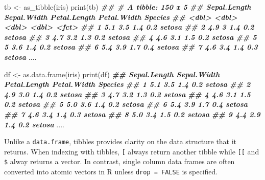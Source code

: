 \documentclass[
]{book}
\newenvironment{Shaded}{\begin{snugshade}}{\end{snugshade}}
\newcommand{\DocumentationTok}[1]{\textcolor[rgb]{0.56,0.35,0.01}{\textbf{\textit{#1}}}}
\newcommand{\FunctionTok}[1]{\textcolor[rgb]{0.00,0.00,0.00}{#1}}
\newcommand{\NormalTok}[1]{#1}
\newcommand{\OtherTok}[1]{\textcolor[rgb]{0.56,0.35,0.01}{#1}}
\begin{document}
\begin{Shaded}
\begin{Highlighting}[]
\NormalTok{tb }\OtherTok{\textless{}{-}} \FunctionTok{as\_tibble}\NormalTok{(iris)}
\FunctionTok{print}\NormalTok{(tb)}
\DocumentationTok{\#\# \# A tibble: 150 x 5}
\DocumentationTok{\#\#    Sepal.Length Sepal.Width Petal.Length Petal.Width Species}
\DocumentationTok{\#\#           \textless{}dbl\textgreater{}       \textless{}dbl\textgreater{}        \textless{}dbl\textgreater{}       \textless{}dbl\textgreater{} \textless{}fct\textgreater{}  }
\DocumentationTok{\#\#  1          5.1         3.5          1.4         0.2 setosa }
\DocumentationTok{\#\#  2          4.9         3            1.4         0.2 setosa }
\DocumentationTok{\#\#  3          4.7         3.2          1.3         0.2 setosa }
\DocumentationTok{\#\#  4          4.6         3.1          1.5         0.2 setosa }
\DocumentationTok{\#\#  5          5           3.6          1.4         0.2 setosa }
\DocumentationTok{\#\#  6          5.4         3.9          1.7         0.4 setosa }
\DocumentationTok{\#\#  7          4.6         3.4          1.4         0.3 setosa }
\NormalTok{....}

\NormalTok{df }\OtherTok{\textless{}{-}} \FunctionTok{as.data.frame}\NormalTok{(iris)}
\FunctionTok{print}\NormalTok{(df)}
\DocumentationTok{\#\#     Sepal.Length Sepal.Width Petal.Length Petal.Width    Species}
\DocumentationTok{\#\# 1            5.1         3.5          1.4         0.2     setosa}
\DocumentationTok{\#\# 2            4.9         3.0          1.4         0.2     setosa}
\DocumentationTok{\#\# 3            4.7         3.2          1.3         0.2     setosa}
\DocumentationTok{\#\# 4            4.6         3.1          1.5         0.2     setosa}
\DocumentationTok{\#\# 5            5.0         3.6          1.4         0.2     setosa}
\DocumentationTok{\#\# 6            5.4         3.9          1.7         0.4     setosa}
\DocumentationTok{\#\# 7            4.6         3.4          1.4         0.3     setosa}
\DocumentationTok{\#\# 8            5.0         3.4          1.5         0.2     setosa}
\DocumentationTok{\#\# 9            4.4         2.9          1.4         0.2     setosa}
\NormalTok{....}
\end{Highlighting}
\end{Shaded}

Unlike a \texttt{data.frame}, tibbles provides clarity on the data structure that it returns. When indexing with tibbles, \texttt{{[}} always return another tibble while \texttt{{[}{[}} and \texttt{\$} alway returns a vector. In contrast, single column data frames are often converted into atomic vectors in R unless \texttt{drop\ =\ FALSE} is specified.
\end{document}
